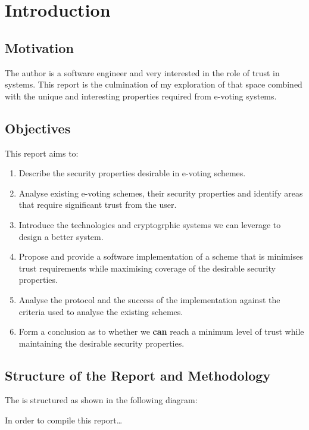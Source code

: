 \chapter{Introduction}
\label{ch:intro}

\section{Motivation}
\label{ch:intro:motiv}

The author is a software engineer and very interested in the role of trust in systems. This report is the culmination of my exploration of that space combined with the unique and interesting properties required from e-voting systems.


\section{Objectives}
\label{ch:intro:object}

This report aims to:

\begin{enumerate}
    \item Describe the security properties desirable in e-voting schemes.
    \item Analyse existing e-voting schemes, their security properties and identify areas that require significant trust from the user.
    \item Introduce the technologies and cryptogrphic systems we can leverage to design a better system.
    \item Propose and provide a software implementation of a scheme that is minimises trust requirements while maximising coverage of the desirable security properties.
    \item Analyse the protocol and the success of the implementation against the criteria used to analyse the existing schemes.
    \item Form a conclusion as to whether we {\textbf{can}} reach a minimum level of trust while maintaining the desirable security properties.
\end{enumerate}


\section{Structure of the Report and Methodology}
\label{ch:intro:method}

The is structured as shown in the following diagram:


In order to compile this report\dots




